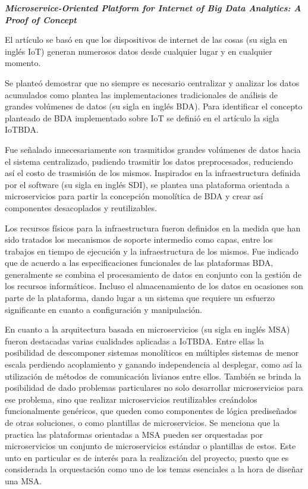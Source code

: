 
\textbf{
    \emph{ Microservice-Oriented Platform for Internet of Big Data Analytics: A Proof of Concept }
} \cite{li_microservice-oriented_2019}

El artículo se basó en que los dispositivos de internet de las cosas (su sigla en inglés IoT) generan numerosos datos desde cualquier lugar y en cualquier momento.

Se planteó demostrar que no siempre es necesario centralizar y analizar los datos acumulados como plantea las implementaciones tradicionales de análisis de grandes volúmenes de datos (su sigla en inglés BDA). Para identificar el concepto planteado de BDA implementado sobre IoT se definió en el artículo la sigla IoTBDA.

Fue señalado innecesariamente son trasmitidos grandes volúmenes de datos hacia el sistema centralizado, pudiendo trasmitir los datos preprocesados, reduciendo así el costo de trasmisión de los mismos. 
Inspirados en la infraestructura definida por el software (su sigla en inglés SDI), se plantea una plataforma orientada a microservicios para partir la concepción monolítica de BDA y crear así componentes desacoplados y reutilizables.

Los recursos físicos para la infraestructura fueron definidos en la medida que han sido tratados los mecanismos de soporte intermedio como capas, entre los trabajos en tiempo de ejecución y la infraestructura de los mismos.
Fue indicado que  de acuerdo a las especificaciones funcionales de las plataformas BDA, generalmente se combina el procesamiento de datos en conjunto con la gestión de los recursos informáticos. Incluso el almacenamiento de los datos en ocasiones son parte de la plataforma, dando lugar a un sistema que requiere un esfuerzo significante en cuanto a configuración y manipulación.

En cuanto a la arquitectura basada en microservicios (su sigla en inglés MSA) fueron destacadas varias cualidades aplicadas a IoTBDA. Entre ellas la posibilidad de descomponer sistemas monolíticos en múltiples sistemas de menor escala perdiendo acoplamiento y ganando independencia al desplegar, como así la utilización de métodos de comunicación livianos entre ellos. También se brinda la posibilidad de dado problemas particulares no solo desarrollar microservicios para ese problema, sino que realizar microservicios reutilizables creándolos funcionalmente genéricos, que queden como componentes de lógica prediseñados de otras soluciones, o como plantillas de microservicios. Se menciona que la practica las plataformas orientadas a MSA pueden ser orquestadas por microservicios un conjunto de microservicios estándar o plantillas de estos. Este unto en particular es de interés para la realización del proyecto, puesto que es considerada la orquestación como uno de los temas esenciales  a  la hora de diseñar una MSA. 

